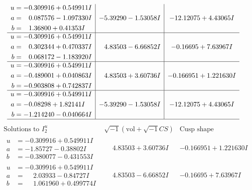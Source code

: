 \documentclass[1p]{elsarticle_modified}
\theoremstyle{definition}
\newcommand{\I}{\sqrt{-1}}
\begin{document}
$$\begin{array}{c|c|c}
\begin{aligned}
u &= -0.309916 + 0.549911 I \\
a &= \phantom{-}0.087576 - 1.097330 I \\
b &= \phantom{-}1.36800 + 0.41353 I\end{aligned}
 & -5.39290 - 1.53058 I & -12.12075 + 4.43065 I \\ \hline\begin{aligned}
u &= -0.309916 + 0.549911 I \\
a &= \phantom{-}0.302344 + 0.470337 I \\
b &= \phantom{-}0.068172 - 1.183920 I\end{aligned}
 & \phantom{-}4.83503 - 6.66852 I & -0.16695 + 7.63967 I \\ \hline\begin{aligned}
u &= -0.309916 + 0.549911 I \\
a &= -0.489001 + 0.040863 I \\
b &= -0.903808 + 0.742837 I\end{aligned}
 & \phantom{-}4.83503 + 3.60736 I & -0.166951 + 1.221630 I \\ \hline\begin{aligned}
u &= -0.309916 + 0.549911 I \\
a &= -0.08298 + 1.82141 I \\
b &= -1.214240 - 0.040664 I\end{aligned}
 & -5.39290 - 1.53058 I & -12.12075 + 4.43065 I\\
 \hline 
 \end{array}$$\newpage$$\begin{array}{c|c|c}  
\text{Solutions to }I^u_{2}& \I (\text{vol} + \sqrt{-1}CS) & \text{Cusp shape}\\
 \hline 
\begin{aligned}
u &= -0.309916 + 0.549911 I \\
a &= -1.85727 - 0.38802 I \\
b &= -0.380077 - 0.431553 I\end{aligned}
 & \phantom{-}4.83503 + 3.60736 I & -0.166951 + 1.221630 I \\ \hline\begin{aligned}
u &= -0.309916 + 0.549911 I \\
a &= \phantom{-}2.03933 - 0.84727 I \\
b &= \phantom{-}1.061960 + 0.499774 I\end{aligned}
 & \phantom{-}4.83503 - 6.66852 I & -0.16695 + 7.63967 I \\ \hline\begin{aligned}

\end{aligned}
\end{array}$$
\end{document}
